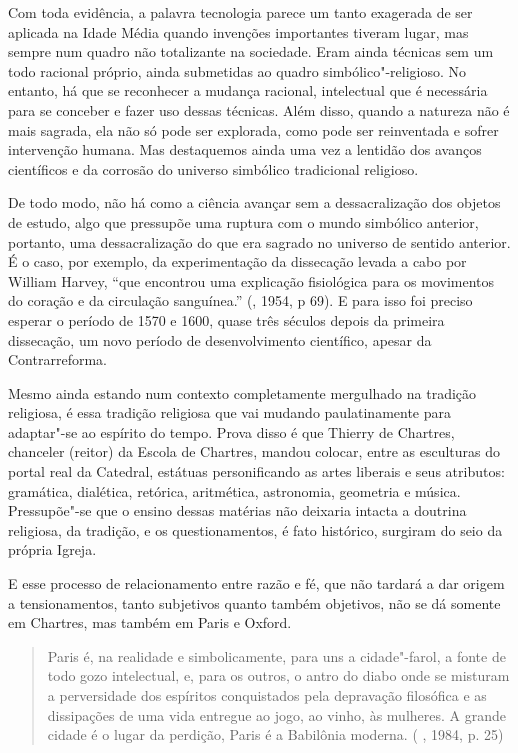 Com toda evidência, a palavra tecnologia parece um tanto exagerada de
ser aplicada na Idade Média quando invenções importantes tiveram lugar,
mas sempre num quadro não totalizante na sociedade. Eram ainda técnicas
sem um todo racional próprio, ainda submetidas ao quadro
simbólico"-religioso. No entanto, há que se reconhecer a mudança
racional, intelectual que é necessária para se conceber e fazer uso
dessas técnicas. Além disso, quando a natureza não é mais sagrada, ela
não só pode ser explorada, como pode ser reinventada e sofrer
intervenção humana. Mas destaquemos ainda uma vez a lentidão dos avanços
científicos e da corrosão do universo simbólico tradicional religioso.

De todo modo, não há como a ciência avançar sem a dessacralização dos
objetos de estudo, algo que pressupõe uma ruptura com o mundo simbólico
anterior, portanto, uma dessacralização do que era sagrado no universo
de sentido anterior. É o caso, por exemplo, da experimentação da
dissecação levada a cabo por William Harvey, ``que encontrou uma
explicação fisiológica para os movimentos do coração e da circulação
sanguínea.'' (, 1954, p 69). E para isso foi preciso esperar o
período de 1570 e 1600, quase três séculos depois da primeira
dissecação, um novo período de desenvolvimento científico, apesar da
Contrarreforma.

Mesmo ainda estando num contexto completamente mergulhado na tradição
religiosa, é essa tradição religiosa que vai mudando paulatinamente para
adaptar"-se ao espírito do tempo. Prova disso é que Thierry de Chartres,
chanceler (reitor) da Escola de Chartres, mandou colocar, entre as
esculturas do portal real da Catedral, estátuas personificando as artes
liberais e seus atributos: gramática, dialética, retórica, aritmética,
astronomia, geometria e música. Pressupõe"-se que o ensino dessas
matérias não deixaria intacta a doutrina religiosa, da tradição, e os
questionamentos, é fato histórico, surgiram do seio da própria Igreja.

E esse processo de relacionamento entre razão e fé, que não tardará a
dar origem a tensionamentos, tanto subjetivos quanto também objetivos,
não se dá somente em Chartres, mas também em Paris e Oxford.

\begin{quote}
Paris é, na realidade e simbolicamente, para uns a cidade"-farol, a fonte
de todo gozo intelectual, e, para os outros, o antro do diabo onde se
misturam a perversidade dos espíritos conquistados pela depravação
filosófica e as dissipações de uma vida entregue ao jogo, ao vinho, às
mulheres. A grande cidade é o lugar da perdição, Paris é a Babilônia
moderna. ( , 1984, p. 25)
\end{quote}

